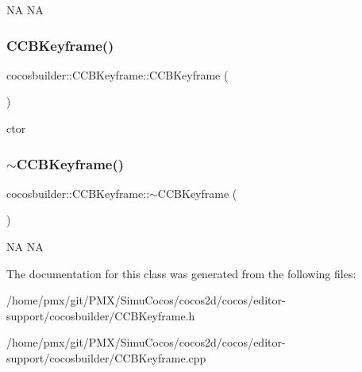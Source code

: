 NA  NA \mbox{\label{classcocosbuilder_1_1CCBKeyframe_a6160211fc093f98d9d2e31a279f99bf3}} 
\subsubsection{\texorpdfstring{C\+C\+B\+Keyframe()}{CCBKeyframe()}\hspace{0.1cm}{\footnotesize\ttfamily [2/2]}}
{\footnotesize\ttfamily cocosbuilder\+::\+C\+C\+B\+Keyframe\+::\+C\+C\+B\+Keyframe (\begin{DoxyParamCaption}{ }\end{DoxyParamCaption})}

ctor \mbox{\label{classcocosbuilder_1_1CCBKeyframe_afe5e89c87bf508f090b0e134e4dc6a40}} 
\subsubsection{\texorpdfstring{$\sim$\+C\+C\+B\+Keyframe()}{~CCBKeyframe()}\hspace{0.1cm}{\footnotesize\ttfamily [2/2]}}
{\footnotesize\ttfamily cocosbuilder\+::\+C\+C\+B\+Keyframe\+::$\sim$\+C\+C\+B\+Keyframe (\begin{DoxyParamCaption}{ }\end{DoxyParamCaption})}

NA  NA 

The documentation for this class was generated from the following files\+:\begin{DoxyCompactItemize}
\item 
/home/pmx/git/\+P\+M\+X/\+Simu\+Cocos/cocos2d/cocos/editor-\/support/cocosbuilder/C\+C\+B\+Keyframe.\+h\item 
/home/pmx/git/\+P\+M\+X/\+Simu\+Cocos/cocos2d/cocos/editor-\/support/cocosbuilder/C\+C\+B\+Keyframe.\+cpp\end{DoxyCompactItemize}
